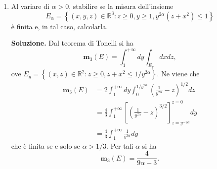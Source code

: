 \begin{enumerate}
	\textbf{Soluzione.}
		L'insieme $A$ è aperto, poiché intersezione dei due aperti $A_1 := \{(x,y) \in \mathbb{R}^2 : x^2 + y^2 < 1\}$ e $A_2 := \{(x,y) \in \mathbb{R}^2 : 0 < y < x/2\}$, e dunque misurabile. In particolare $A$ è un settore circolare (aperto) della circonferenza goniometrica di apertura angolare $\arctan(1/2)$. L'integrale esiste perché la funzione è misurabile (poiché continua) e positiva su $A$. Usando le coordinate polari, dobbiamo calcolare
		\[
		\iint_A \frac{1}{\rho \cos \theta} \sqrt{\frac{\rho^4 \sin^2 \theta}{1 - \rho^2}} \rho d\rho d\theta = \int_0^{\arctan(1/2)} \frac{|\sin \theta|}{\cos \theta} d\theta \int_0^1 \frac{\rho^2}{\sqrt{1 - \rho^2}} d\rho.
		\]
		Nell'intervallo di $\theta$ preso in considerazione, il $\sin \theta$ è positivo e dunque si può eliminare il modulo. Pertanto il primo integrale diventa
		\[
		\int_0^{\arctan(1/2)} \tan \theta d\theta = \left[-\log(\cos \theta)\right]_0^{\arctan(1/2)}.
		\]
		Nell'intervallo di $\theta$ considerato, vale $\cos \theta = \frac{1}{\sqrt{1 + \tan^2 \theta}}$ e dunque
		\[
		\cos(\arctan(1/2)) = \frac{2}{\sqrt{5}}.
		\]
		Pertanto
		\[
		\int_0^{\arctan(1/2)} \tan \theta d\theta = -\log\left(\frac{2}{\sqrt{5}}\right).
		\]
		Per calcolare l'integrale in $d\rho$, si può procedere per parti, scrivendo l'integranda come $\rho \cdot \frac{\rho}{\sqrt{1 - \rho^2}}$, notando che una primitiva del secondo termine è $-\sqrt{1 - \rho^2}$. Dunque
		\[
		\int_0^1 \frac{\rho^2}{\sqrt{1 - \rho^2}} d\rho = \left[-\rho \sqrt{1 - \rho^2}\right]_0^1 + \int_0^1 \sqrt{1 - \rho^2} d\rho = \int_0^1 \sqrt{1 - \rho^2} d\rho.
		\]
		L'ultimo integrale può essere calcolato mediante le solite sostituzioni goniometriche. Risulta
		\[
		\int_0^1 \sqrt{1 - \rho^2} d\rho = \frac{1}{2} \left[\rho \sqrt{1 - \rho^2} + \arcsin \rho\right]_0^1 = \frac{\pi}{4}.
		\]
		Unendo i due risultati si ottiene
		\[
		\iint_A \frac{1}{\rho \cos \theta} \sqrt{\frac{\rho^4 \sin^2 \theta}{1 - \rho^2}} \rho d\rho d\theta = -\frac{\pi}{4} \log\left(\frac{2}{\sqrt{5}}\right) = \frac{\pi}{8} \log\left(\frac{5}{4}\right).
		\]
	
	
	\item Al variare di $\alpha > 0$, stabilire se la misura dell'insieme
	\[
	E_{\alpha} = \left\{(x,y,z) \in \mathbb{R}^3 : z \geq 0, y \geq 1, y^{2\alpha}(z + x^2) \leq 1\right\}
	\]
	è finita e, in tal caso, calcolarla.
	
	\textbf{Soluzione.}
		Dal teorema di Tonelli si ha
		\[
		\mathbf{m}_3(E) = \int_1^{+\infty} dy \int_{E_y} dx dz,
		\]
		ove $E_y = \left\{(x,z) \in \mathbb{R}^2 : z \geq 0, z + x^2 \leq 1/y^{2\alpha}\right\}$. Ne viene che
		\[
		\begin{aligned}
			\mathbf{m}_3(E) &= 2 \int_1^{+\infty} dy \int_0^{1/y^{2\alpha}} \left(\frac{1}{y^{2\alpha}} - z\right)^{1/2} dz \\
			&= \frac{4}{3} \int_1^{+\infty} \left[\left(\frac{1}{y^{2\alpha}} - z\right)^{3/2}\right]_{z = y^{-2\alpha}}^{z = 0} dy \\
			&= \frac{4}{3} \int_1^{+\infty} \frac{1}{y^{3\alpha}} dy
		\end{aligned}
		\]
		che è finita se e solo se $\alpha > 1/3$. Per tali $\alpha$ si ha
		\[
		\mathbf{m}_3(E) = \frac{4}{9\alpha - 3}.
		\]
	

\end{enumerate}
